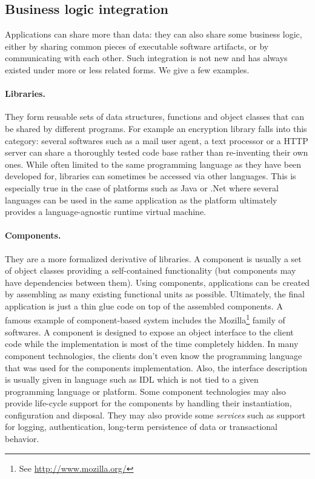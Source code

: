 
\subsection{Business logic integration}


Applications can share more than data: they can also share some business logic, either by sharing common pieces of executable software artifacts, or by communicating with each other. Such integration is not new and has always existed under more or less related forms. We give a few examples.\\

\paragraph{Libraries.}
They form reusable sets of data structures, functions and object classes that can be shared by different programs. For example an encryption library falls into this category: several softwares such as a mail user agent, a text processor or a HTTP server can share a thoroughly tested code base rather than re-inventing their own ones. While often limited to the same programming language as they have been developed for, libraries can sometimes be accessed via other languages. This is especially true in the case of platforms such as Java or .Net where several languages can be used in the same application as the platform ultimately provides a language-agnostic runtime virtual machine.\\
  
\paragraph{Components.}
They are a more formalized derivative of libraries. A component is usually a set of object classes providing a self-contained functionality (but components may have dependencies between them).  Using components, applications can be created by assembling as many existing functional units as possible. Ultimately, the final application is just a thin glue code on top of the assembled components. A famous example of component-based system includes the Mozilla\footnote{See \url{http://www.mozilla.org/}} family of softwares. A component is designed to expose an object interface to the client code while the implementation is most of the time completely hidden. In many component technologies, the clients don't even know the programming language that was used for the components implementation. Also, the interface description is usually given in language such as IDL \cite{Lamb87} which is not tied to a given programming language or platform. Some component technologies may also provide life-cycle support for the components by handling their instantiation, configuration and disposal. They may also provide some \emph{services} such as support for logging, authentication, long-term persistence of data or transactional behavior.\\
  
